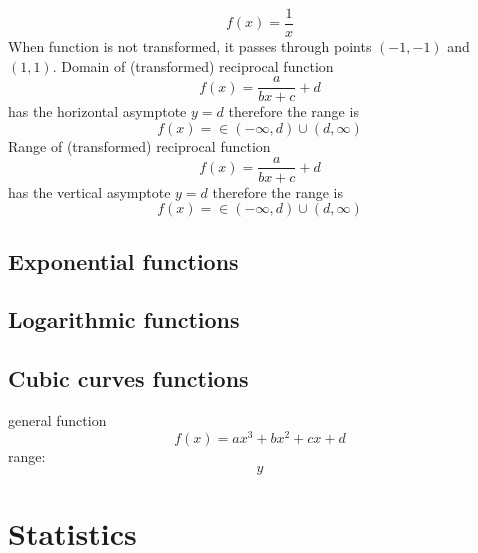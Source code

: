 \documentclass{article}
\begin{document}
\begin{equation}
  f(x) = \frac{1}{x}
\end{equation}
When function is not transformed, it passes through points $(-1, -1)$ and $(1, 1)$.
Domain of (transformed) reciprocal function
\begin{equation}
f(x) = \frac{a}{bx+c} + d
\end{equation}
has the horizontal asymptote $y = d$ therefore the range is
\begin{equation}
f(x) = \in (-\infty, d) \cup (d, \infty)
\end{equation}
Range of (transformed) reciprocal function
\begin{equation}
f(x) = \frac{a}{bx+c} + d
\end{equation}
has the vertical asymptote $y = d$ therefore the range is
\begin{equation}
f(x) = \in (-\infty, d) \cup (d, \infty)
\end{equation}


\subsection{Exponential functions}
\subsection{Logarithmic functions}
\subsection{Cubic curves functions}
general function
\begin{equation}
  f(x) = ax^3 + bx^2 + cx + d
\end{equation}
range:
\begin{equation}
  y
\end{equation}

\section{Statistics}
\end{document}
